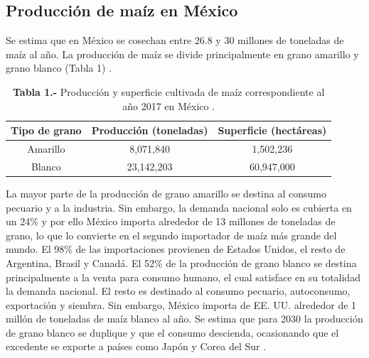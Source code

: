 \documentclass[12pt,letterpaper,oneside]{report}
\begin{document}
\subsection{Producción de maíz en México}
Se estima que en México se cosechan entre 26.8 y 30 millones de toneladas de maíz al año. La producción de maíz se divide principalmente en grano amarillo y grano blanco (Tabla 1) \autocite{USDA2018}.
\par
\begin{table}[!h]
\begin{center}
\caption*{\textbf{Tabla 1.-} Producción y superficie cultivada de maíz correspondiente al año 2017 en México \autocite{INEGI2018}.}
\label{Tabla 1}
\begin{tabular}{ccc}
\toprule[0.5mm]
Tipo de grano & Producción (toneladas) & Superficie (hectáreas)\\
\midrule
Amarillo & 8,071,840 & 1,502,236 \\
Blanco & 23,142,203 & 60,947,000 \\
\bottomrule[0.5mm]
\end{tabular}
\end{center}
\end{table}
La mayor parte de la producción de grano amarillo se destina al consumo pecuario y a la industria. Sin embargo, la demanda nacional solo es cubierta en un 24\% y por ello México importa alrededor de 13 millones de toneladas de grano, lo que lo convierte en el segundo importador de maíz más grande del mundo. El 98\% de las importaciones provienen de Estados Unidos, el resto de Argentina, Brasil y Canadá. El 52\% de la producción de grano blanco se destina principalmente a la venta para consumo humano, el cual satisface en su totalidad la demanda nacional. El resto es destinado al consumo pecuario, autoconsumo, exportación y siembra. Sin embargo, México importa de EE. UU. alrededor de 1 millón de toneladas de maíz blanco al año. Se estima que para 2030 la producción de grano blanco se duplique y que el consumo descienda, ocasionando que el excedente se exporte a países como Japón y Corea del Sur \autocite{SAGARPA2017}.
\end{document}
